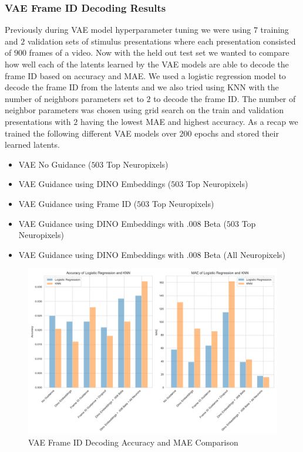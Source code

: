 \documentclass[12pt, letterpaper]{article}
\begin{document}
\subsubsection{VAE Frame ID Decoding Results}
\label{subsubsec:vae_frame_id_decoding}
Previously during VAE model hyperparameter tuning we were using $7$ training and $2$ validation sets of stimulus presentations where each presentation consisted of $900$ frames of a video. Now with the held out test set we wanted to compare how well each of the latents learned by the VAE models are able to decode the frame ID based on accuracy and MAE. We used a logistic regression model to decode the frame ID from the latents and we also tried using KNN with the number of neighbors parameters set to $2$ to decode the frame ID. The number of neighbor parameters was chosen using grid search on the train and validation presentations with $2$ having the lowest MAE and highest accuracy. As a recap we trained the following different VAE models over $200$ epochs and stored their learned latents.

\begin{itemize}
    \item VAE No Guidance ($503$ Top Neuropixels)
    \item VAE Guidance using DINO Embeddings ($503$ Top Neuropixels)
    \item VAE Guidance using Frame ID ($503$ Top Neuropixels)
    \item VAE Guidance using DINO Embeddings with .008 Beta ($503$ Top Neuropixels)
    \item VAE Guidance using DINO Embeddings with .008 Beta (All Neuropixels)
\end{itemize}

\begin{figure}[H]
    \centering
    \includegraphics[width=1.0\textwidth]{vae_models_logistic_knn_comparison.png}
    \caption{VAE Frame ID Decoding Accuracy and MAE Comparison}
    \label{fig:vae_frame_id_decoding_comparison}
\end{figure}
\end{document}
